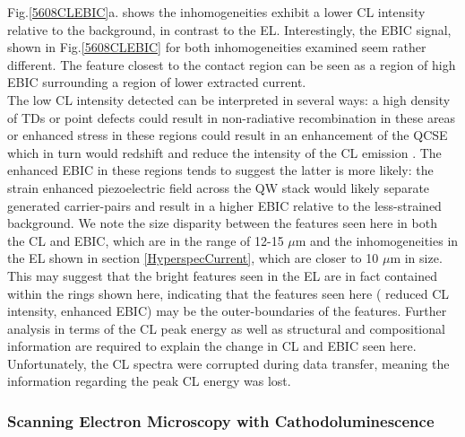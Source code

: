Fig.\ref{5608CLEBIC}a. shows the inhomogeneities exhibit a lower CL intensity relative to the background, in contrast to the EL. Interestingly, the EBIC signal, shown in Fig.\ref{5608CLEBIC} for both inhomogeneities examined seem rather different. The feature closest to the contact region can be seen as a region of high EBIC surrounding a region of lower extracted current. \\
The low CL intensity detected can be interpreted in several ways: a high density of TDs or point defects could result in non-radiative recombination in these areas \cite{Polyakov1998,Bennett2010b} or enhanced stress in these regions could result in an enhancement of the QCSE which in turn would redshift and reduce the intensity of the CL emission \cite{Ren2015,Ryou2009}. The enhanced EBIC in these regions tends to suggest the latter is more likely: the strain enhanced piezoelectric field across the QW stack would likely separate generated carrier-pairs \cite{Chichibu1999} and result in a higher EBIC relative to the less-strained background. We note the size disparity between the features seen here in both the CL and EBIC, which are in the range of 12-15 $\mu$m and the inhomogeneities in the EL shown in section \ref{HyperspecCurrent}, which are closer to 10 $\mu$m in size. This may suggest that the bright features seen in the EL are in fact contained within the rings shown here, indicating that the features seen here ( reduced CL intensity, enhanced EBIC) may be the outer-boundaries of the features. Further analysis in terms of the CL peak energy as well as structural and compositional information are required to explain the change in CL and EBIC seen here. Unfortunately, the CL spectra were corrupted during data transfer, meaning the information regarding the peak CL energy was lost.

\subsubsection{Scanning Electron Microscopy with Cathodoluminescence}

